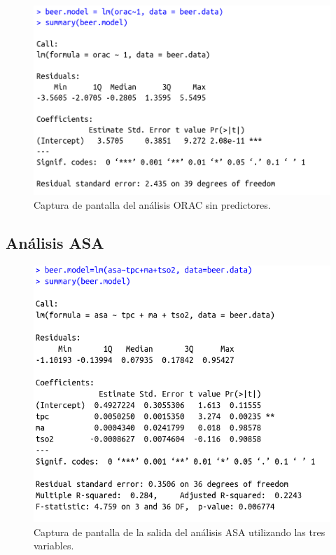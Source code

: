 \documentclass{article}
\begin{document}
\begin{figure}[htbp]
    \centering
    \includegraphics[scale=0.4]{images/media_orac.png}
    \caption{Captura de pantalla del análisis ORAC sin predictores.}
    \label{fig:media_orac}
\end{figure}


\newpage
\subsection{Análisis ASA}
\begin{figure}[htbp]
    \centering
    \includegraphics[scale=0.4]{images/asa_3_variables.png}
    \caption{Captura de pantalla de la salida del análisis ASA  utilizando las tres variables.}
    \label{fig:asa_3_variables}
\end{figure}
\end{document}
